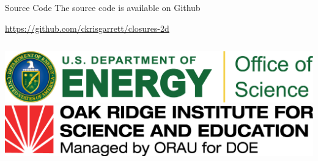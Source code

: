 \documentclass{beamer}
\begin{document}
    \begin{frame}{Source Code}
        The source code is available on Github

        \url{https://github.com/ckrisgarrett/closures-2d}

        \vfill

        \begin{columns}
            \includegraphics[width=\textwidth]{DOESClogo.png}
            \includegraphics[width=\textwidth]{ORISElogo.png}
        \end{columns}
    \end{frame}
\end{document}

